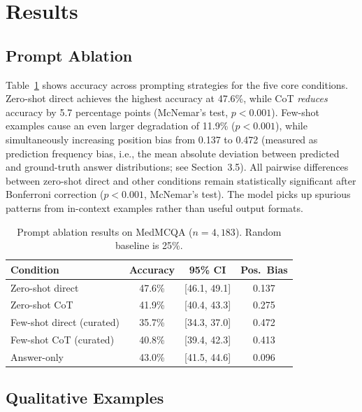 \documentclass[runningheads,a4paper]{llncs}
\begin{document}
\section{Results}

\subsection{Prompt Ablation}

Table~\ref{tab:prompt_ablation} shows accuracy across prompting strategies for the five core conditions. Zero-shot direct achieves the highest accuracy at 47.6\%, while CoT \textit{reduces} accuracy by 5.7 percentage points (McNemar's test, $p < 0.001$). Few-shot examples cause an even larger degradation of 11.9\% ($p < 0.001$), while simultaneously increasing position bias from 0.137 to 0.472 (measured as prediction frequency bias, i.e., the mean absolute deviation between predicted and ground-truth answer distributions; see Section~3.5). All pairwise differences between zero-shot direct and other conditions remain statistically significant after Bonferroni correction ($p < 0.001$, McNemar's test). The model picks up spurious patterns from in-context examples rather than useful output formats.

\begin{table}[t]
\centering
\caption{Prompt ablation results on MedMCQA ($n{=}4{,}183$). Random baseline is 25\%.}
\label{tab:prompt_ablation}
\begin{tabular}{lccc}
\toprule
\textbf{Condition} & \textbf{Accuracy} & \textbf{95\% CI} & \textbf{Pos.\ Bias} \\
\midrule
Zero-shot direct & 47.6\% & [46.1, 49.1] & 0.137 \\
Zero-shot CoT & 41.9\% & [40.4, 43.3] & 0.275 \\
Few-shot direct (curated) & 35.7\% & [34.3, 37.0] & 0.472 \\
Few-shot CoT (curated) & 40.8\% & [39.4, 42.3] & 0.413 \\
Answer-only & 43.0\% & [41.5, 44.6] & 0.096 \\
\bottomrule
\end{tabular}
\end{table}

\subsection{Qualitative Examples}
\end{document}
